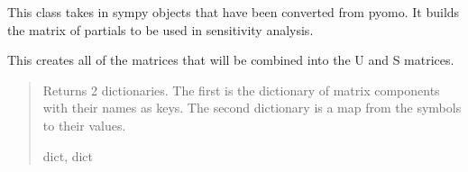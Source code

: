 \documentclass[letterpaper,10pt,english]{sphinxmanual}
\begin{document}
\begin{fulllineitems}
\label{\detokenize{src.sensitivity.faster_sensitivity:src.sensitivity.faster_sensitivity.SensitivityMatrix}}
\pysigstartsignatures
\pysiglinewithargsret
{}
{\sphinxparamcomma {}\sphinxparamcomma {}}
{}
\pysigstopsignatures
\sphinxAtStartPar
This class takes in sympy objects that have been converted from pyomo.
It builds the matrix of partials to be used in sensitivity analysis.

\begin{fulllineitems}
\label{\detokenize{src.sensitivity.faster_sensitivity:src.sensitivity.faster_sensitivity.SensitivityMatrix.generate_matrix}}
\pysigstartsignatures
\pysiglinewithargsret
{}
{}
{}
\pysigstopsignatures
\sphinxAtStartPar
This creates all of the matrices that will be combined into the U and S matrices.
\begin{quote}\begin{description}
\sphinxAtStartPar
Returns 2 dictionaries. The first is the dictionary of matrix components with their names as keys.
The second dictionary is a map from the symbols to their values.

\sphinxAtStartPar
dict, dict

\end{description}\end{quote}

\end{fulllineitems}



\end{fulllineitems}
\end{document}
